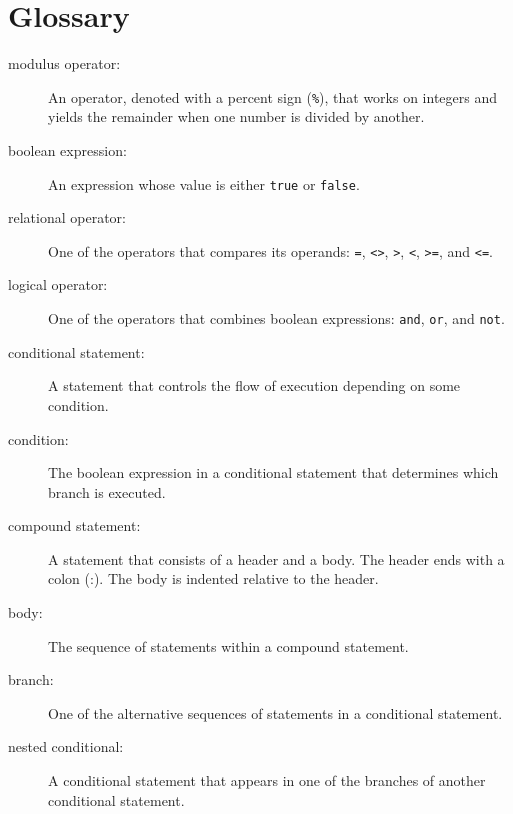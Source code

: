\documentclass[10pt]{book}
\begin{document}
\section{Glossary}
\begin{description}

\item[modulus operator:]  An operator, denoted with a percent sign
({\tt \%}), that works on integers and yields the remainder when one
number is divided by another.

\item[boolean expression:]  An expression whose value is either 
{\tt true} or {\tt false}.

\item[relational operator:] One of the operators that compares
its operands: {\tt =}, {\tt <>}, {\tt >}, {\tt <}, {\tt >=}, and {\tt <=}.

\item[logical operator:] One of the operators that combines boolean
expressions: {\tt and}, {\tt or}, and {\tt not}.

\item[conditional statement:]  A statement that controls the flow of
execution depending on some condition.

\item[condition:] The boolean expression in a conditional statement
that determines which branch is executed.

\item[compound statement:]  A statement that consists of a header
and a body.  The header ends with a colon (:).  The body is indented
relative to the header.

\item[body:] The sequence of statements within a compound statement.

\item[branch:] One of the alternative sequences of statements in
a conditional statement.

\item[nested conditional:]  A conditional statement that appears
in one of the branches of another conditional statement.

\end{description}
\end{document}
